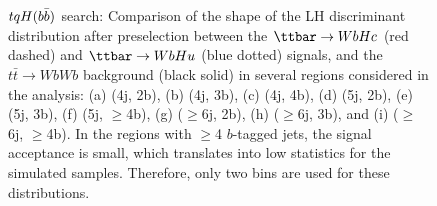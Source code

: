 \begin{figure}[htbp]
\begin{center}
 \\
 \\
\caption{$tqH(b\bar{b})$ search: Comparison of the shape of the LH discriminant distribution after preselection 
between the $\Hc$ (red dashed) and $\Hu$ (blue dotted) signals, 
and the $t\bar{t}\to WbWb$ background (black solid) in several regions considered in the analysis:
(a) (4j, 2b), (b) (4j, 3b), (c) (4j, 4b), (d) (5j, 2b), (e) (5j, 3b), (f) (5j, $\geq$4b), (g) ($\geq$6j, 2b), 
(h) ($\geq$6j, 3b), and (i) ($\geq$6j, $\geq$4b). 
In the regions with $\geq$4 $b$-tagged jets, the signal acceptance is small, which translates
into low statistics for the simulated samples. Therefore, only two bins are used for these distributions.} 
\label{fig:LHD}
\end{center}
\end{figure}



